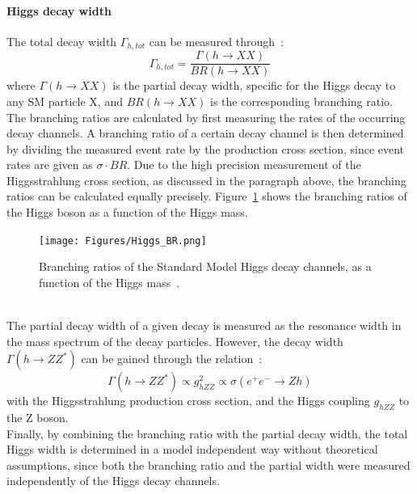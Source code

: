 \paragraph{Higgs decay width}
The total decay width $\Gamma_{h,tot}$ can be measured through~\cite[p. 14]{PhysicsCase}:
\begin{equation}
 \Gamma_{h,tot}=\frac{\Gamma(h\rightarrow XX)}{BR(h\rightarrow XX)}
\end{equation}
where $\Gamma(h\rightarrow XX)$ is the partial decay width, specific for the Higgs decay to any SM particle X, and $BR(h\rightarrow XX)$ is the corresponding branching ratio.\\
The branching ratios are calculated by first measuring the rates of the occurring decay channels.
A branching ratio of a certain decay channel is then determined by dividing the measured event rate by the production cross section, since event rates are given as $\sigma\cdot BR$.
Due to the high precision measurement of the Higgsstrahlung cross section, as discussed in the paragraph above, the branching ratios can be calculated equally precisely.
Figure~\ref{fig:HiggsBR} shows the branching ratios of the Higgs boson as a function of the Higgs mass.
\begin{figure}
\centering
\texttt{[image: Figures/Higgs\_BR.png]}
\caption[Higgs decay branching ratios]{Branching ratios of the Standard Model Higgs decay channels, as a function of the Higgs mass~\cite[p. 15]{TDR2}.}
\label{fig:HiggsBR}
\end{figure}
\\The partial decay width of a given decay is measured as the resonance width in the mass spectrum of the decay particles.
However, the decay width $\Gamma(h\rightarrow ZZ^*)$ can be gained through the relation~\cite[p. 14]{PhysicsCase}:
\begin{equation}
 \Gamma(h\rightarrow ZZ^*)\propto g^2_{hZZ} \propto \sigma(e^+e^-\rightarrow Zh)
\end{equation}
with the Higgsstrahlung production cross section, and the Higgs coupling $g_{hZZ}$ to the Z boson. 
\\Finally, by combining the branching ratio with the partial decay width, the total Higgs width is determined in a model independent way without theoretical assumptions, since both the branching ratio and the partial width were measured independently of the Higgs decay channels.

